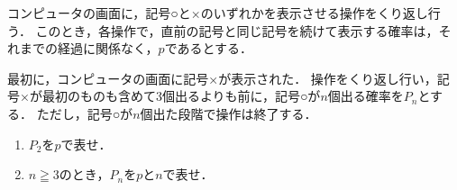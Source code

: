 \documentclass[../../main.tex]{subfiles}
\begin{document}
コンピュータの画面に，記号○と×のいずれかを表示させる操作をくり返し行う．
このとき，各操作で，直前の記号と同じ記号を続けて表示する確率は，それまでの経過に関係なく，$p$であるとする．

最初に，コンピュータの画面に記号×が表示された．
操作をくり返し行い，記号×が最初のものも含めて3個出るよりも前に，記号○が$n$個出る確率を$P_n$とする．
ただし，記号○が$n$個出た段階で操作は終了する．
\begin{enumerate}
  \item $P_2$を$p$で表せ．
  \item $n \geqq 3$のとき，$P_n$を$p$と$n$で表せ．
\end{enumerate}
\end{document}
